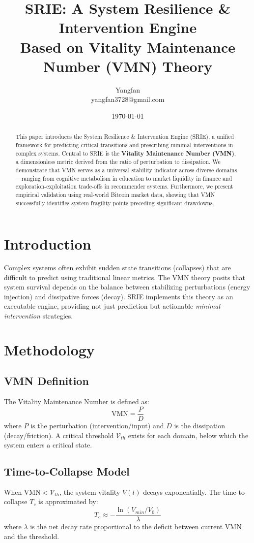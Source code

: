\documentclass{article}
\title{SRIE: A System Resilience \& Intervention Engine \\ Based on Vitality Maintenance Number (VMN) Theory}
\author{Yangfan\\yangfan3728@gmail.com}
\date{\today}
\begin{document}
\maketitle

\begin{abstract}
This paper introduces the System Resilience \& Intervention Engine (SRIE), a unified framework for predicting critical transitions and prescribing minimal interventions in complex systems. Central to SRIE is the \textbf{Vitality Maintenance Number (VMN)}, a dimensionless metric derived from the ratio of perturbation to dissipation. We demonstrate that VMN serves as a universal stability indicator across diverse domains—ranging from cognitive metabolism in education to market liquidity in finance and exploration-exploitation trade-offs in recommender systems. Furthermore, we present empirical validation using real-world Bitcoin market data, showing that VMN successfully identifies system fragility points preceding significant drawdowns.
\end{abstract}

\section{Introduction}
Complex systems often exhibit sudden state transitions (collapses) that are difficult to predict using traditional linear metrics. The VMN theory posits that system survival depends on the balance between stabilizing perturbations (energy injection) and dissipative forces (decay). SRIE implements this theory as an executable engine, providing not just prediction but actionable \textit{minimal intervention} strategies.

\section{Methodology}
\subsection{VMN Definition}
The Vitality Maintenance Number is defined as:
\begin{equation}
\text{VMN} = \frac{P}{D}
\end{equation}
where $P$ is the perturbation (intervention/input) and $D$ is the dissipation (decay/friction). A critical threshold $\mathcal{V}_{th}$ exists for each domain, below which the system enters a critical state.

\subsection{Time-to-Collapse Model}
When $\text{VMN} < \mathcal{V}_{th}$, the system vitality $V(t)$ decays exponentially. The time-to-collapse $T_c$ is approximated by:
\begin{equation}
T_c \approx -\frac{\ln(V_{min}/V_0)}{\lambda}
\end{equation}
where $\lambda$ is the net decay rate proportional to the deficit between current VMN and the threshold.
\end{document}
